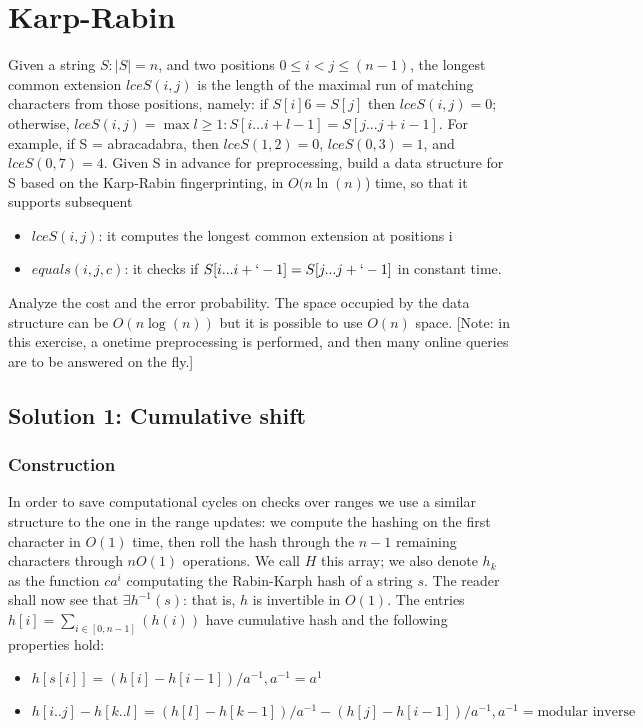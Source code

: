 \documentclass{article}
\begin{document}
\section{Karp-Rabin}
Given a string $S: |S| = n$, and two positions $0 \leq i < j \leq (n - 1)$,
the longest common extension $lceS(i, j)$ is the length of the maximal run of matching
characters from those positions, namely: if $S[i] 6= S[j]$ then $lceS(i, j) = 0$;
otherwise, $lceS(i, j) = \max{l \geq 1 : S[i ... i + l - 1] = S[j ... j + i - 1]}$.
For example, if S = abracadabra, then $lceS(1, 2) = 0$, $lceS(0, 3) = 1$, and
$lceS(0, 7) = 4$.
Given S in advance for preprocessing, build a data structure for S based
on the Karp-Rabin fingerprinting, in $O(n \ln(n)$) time, so that it supports subsequent
\begin{itemize}
    \begin{itemize}
    \item $lceS(i, j)$: it computes the longest common extension at positions i
    \item $equals (i, j, c)$: it checks if $S[i ... i + ` - 1] = S[j ... j + ` - 1]$ in constant time.
\end{itemize}
    \end{itemize}
Analyze the cost and the error probability.
The space occupied by the data structure can be $O(n \log(n))$ but it is possible
to use $O(n)$ space.
[Note: in this exercise, a onetime preprocessing is performed, and then many online
queries are to be answered on the fly.]

\subsection{Solution 1: Cumulative shift}
\subsubsection{Construction}

In order to save computational cycles on checks over ranges we use a similar structure
to the one in the range updates: we compute the hashing on the first character in $O(1)$
time, then roll the hash through the $n - 1$ remaining characters through $n O(1)$
operations.
We call $H$ this array; we also denote $h_k$ as the function $c a^{i}$ computating
the Rabin-Karph hash of a string $s$.
The reader shall now see that $\exists h^{-1}(s)$: that is, $h$ is invertible in $O(1)$.
The entries $h[i] = \sum_{i \in [0, n - 1]}(h(i))$ have cumulative hash and the following
properties hold:
    \begin{itemize}
    \item $h[s[i]] = (h[i] - h[i - 1]) / a^{-1}, a^{-1} = a^{1}$
    \item $h[i..j] - h[k..l] = (h[l] - h[k - 1]) / a^{-1} -
            (h[j] - h[i - 1]) / a^{-1}, a^{-1} = \textrm{modular inverse}$
    \end{itemize}
\end{document}
